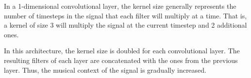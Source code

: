 
In a 1-dimensional convolutional layer, the kernel size
generally represents the number of timesteps in the signal
that each filter will multiply at a time. That is, a kernel
of size $3$ will multiply the signal at the current timestep
and 2 additional ones.

In this architecture, the kernel size is doubled for each
convolutional layer. The resulting filters of each layer are
concatenated with the ones from the previous layer. Thus,
the musical context of the signal is gradually increased.
